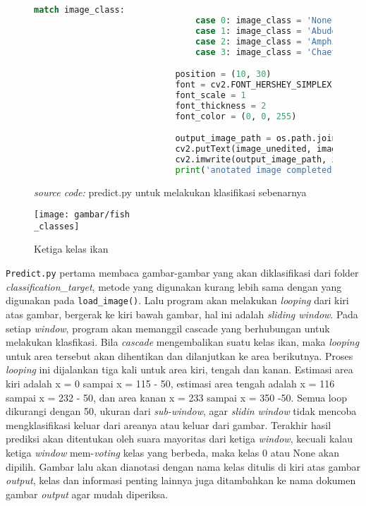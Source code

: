 \begin{figure}[H]
\begin{lstlisting}[language=Python, basicstyle=\tiny]
							match image_class:
								case 0: image_class = 'None'
								case 1: image_class = 'Abudefduf'
								case 2: image_class = 'Amphiprion'
								case 3: image_class = 'Chaetodon'

							position = (10, 30)
							font = cv2.FONT_HERSHEY_SIMPLEX
							font_scale = 1
							font_thickness = 2
							font_color = (0, 0, 255)

							output_image_path = os.path.join('classification_results\\', os.path.splitext(filename)[0] + '.jpg')
							cv2.putText(image_unedited, image_class, position, font, font_scale, font_color, font_thickness)
							cv2.imwrite(output_image_path, image_unedited)
							print('anotated image completed!')

			\end{lstlisting}
			\caption{\emph{source code: } predict.py untuk melakukan klasifikasi sebenarnya}
			\label{code: predict.py}
		\end{figure}

		\begin{figure}[H]
			\centering{}
			  \texttt{[image: gambar/fish\\\_classes]}
			\caption{Ketiga kelas ikan}
		\end{figure}

		\texttt{Predict.py} pertama membaca gambar-gambar yang akan diklasifikasi dari folder 
		\textit{classification\_target}, metode yang digunakan kurang lebih sama dengan 
		yang digunakan pada \texttt{load\_image()}. Lalu program akan melakukan \textit{looping} 
		dari kiri atas gambar, bergerak ke kiri bawah gambar, hal ini adalah \emph{sliding window}. 
		Pada setiap \emph{window}, program akan memanggil cascade yang berhubungan untuk melakukan klasfikasi. 
		Bila \emph{cascade} mengembalikan suatu kelas ikan, maka \textit{looping} untuk area tersebut 
		akan dihentikan dan dilanjutkan ke area berikutnya. Proses \textit{looping} ini dijalankan 
		tiga kali untuk area kiri, tengah dan kanan. Estimasi area kiri adalah x = 0 sampai x = 115 - 50, 
		estimasi area tengah adalah x = 116 sampai x = 232 - 50, dan area kanan x = 233 sampai x = 350 -50. 
		Semua loop dikurangi dengan 50, ukuran dari \emph{sub-window}, agar \textit{slidin window} tidak mencoba mengklasifikasi keluar dari 
		areanya atau keluar dari gambar. Terakhir hasil prediksi akan ditentukan oleh suara 
		mayoritas dari ketiga \textit{window}, kecuali kalau ketiga \emph{window} mem-\textit{voting} 
		kelas yang berbeda, maka kelas 0 atau None akan dipilih. Gambar lalu akan dianotasi dengan nama 
		kelas ditulis di kiri atas gambar \textit{output}, kelas dan informasi penting lainnya juga ditambahkan 
		ke nama dokumen gambar \textit{output} agar mudah diperiksa.


